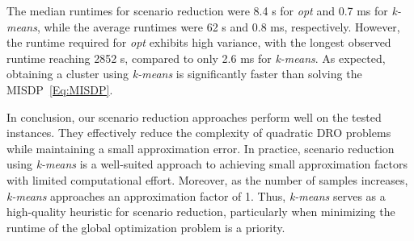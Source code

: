 \documentclass{article}
\begin{document}
The median runtimes for scenario reduction were 8.4 s for \emph{opt} and 0.7 ms for \emph{k-means}, while the average runtimes were 62 s and 0.8 ms, respectively.  
However, the runtime required for \emph{opt} exhibits high variance, with the longest observed runtime reaching 2852 s, compared to only 2.6 ms for \emph{k-means}.
As expected, obtaining a cluster using \emph{k-means} is significantly faster than solving the MISDP~\eqref{Eq:MISDP}.  

In conclusion, our scenario reduction approaches perform well on the tested instances.  
They effectively reduce the complexity of quadratic DRO problems while maintaining a small approximation error.  
In practice, scenario reduction using \emph{k-means}  is a well-suited approach to achieving small approximation factors with limited computational effort.   
Moreover, as the number of samples increases, \emph{k-means} approaches an approximation factor of 1.  
Thus, \emph{k-means} serves as a high-quality heuristic for scenario reduction, particularly when minimizing the runtime of the global optimization problem is a priority.  


\end{document}

